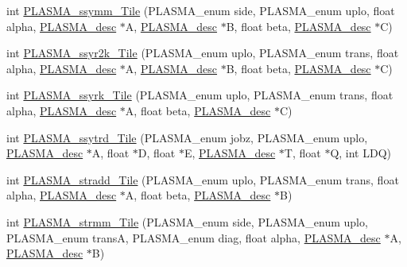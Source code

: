 \begin{DoxyCompactItemize}
\item 
int \hyperlink{group__float__Tile_gaed8391eebdf7b458e7a62dbfb6caff93_gaed8391eebdf7b458e7a62dbfb6caff93}{P\+L\+A\+S\+M\+A\+\_\+ssymm\+\_\+\+Tile} (P\+L\+A\+S\+M\+A\+\_\+enum side, P\+L\+A\+S\+M\+A\+\_\+enum uplo, float alpha, \hyperlink{structplasma__desc__t}{P\+L\+A\+S\+M\+A\+\_\+desc} $\ast$A, \hyperlink{structplasma__desc__t}{P\+L\+A\+S\+M\+A\+\_\+desc} $\ast$B, float beta, \hyperlink{structplasma__desc__t}{P\+L\+A\+S\+M\+A\+\_\+desc} $\ast$C)
\item 
int \hyperlink{group__float__Tile_ga1c0cbf7def70b0d7783d944051aef00e_ga1c0cbf7def70b0d7783d944051aef00e}{P\+L\+A\+S\+M\+A\+\_\+ssyr2k\+\_\+\+Tile} (P\+L\+A\+S\+M\+A\+\_\+enum uplo, P\+L\+A\+S\+M\+A\+\_\+enum trans, float alpha, \hyperlink{structplasma__desc__t}{P\+L\+A\+S\+M\+A\+\_\+desc} $\ast$A, \hyperlink{structplasma__desc__t}{P\+L\+A\+S\+M\+A\+\_\+desc} $\ast$B, float beta, \hyperlink{structplasma__desc__t}{P\+L\+A\+S\+M\+A\+\_\+desc} $\ast$C)
\item 
int \hyperlink{group__float__Tile_gacf870fa2eddaa1a0c47b0ac8ddecab46_gacf870fa2eddaa1a0c47b0ac8ddecab46}{P\+L\+A\+S\+M\+A\+\_\+ssyrk\+\_\+\+Tile} (P\+L\+A\+S\+M\+A\+\_\+enum uplo, P\+L\+A\+S\+M\+A\+\_\+enum trans, float alpha, \hyperlink{structplasma__desc__t}{P\+L\+A\+S\+M\+A\+\_\+desc} $\ast$A, float beta, \hyperlink{structplasma__desc__t}{P\+L\+A\+S\+M\+A\+\_\+desc} $\ast$C)
\item 
int \hyperlink{group__float__Tile_ga48bcda071b83ef090b76b5e19aedc803_ga48bcda071b83ef090b76b5e19aedc803}{P\+L\+A\+S\+M\+A\+\_\+ssytrd\+\_\+\+Tile} (P\+L\+A\+S\+M\+A\+\_\+enum jobz, P\+L\+A\+S\+M\+A\+\_\+enum uplo, \hyperlink{structplasma__desc__t}{P\+L\+A\+S\+M\+A\+\_\+desc} $\ast$A, float $\ast$D, float $\ast$E, \hyperlink{structplasma__desc__t}{P\+L\+A\+S\+M\+A\+\_\+desc} $\ast$T, float $\ast$Q, int L\+D\+Q)
\item 
int \hyperlink{group__float__Tile_gaf9bfae96f9bb34fa3008c593a5b5e948_gaf9bfae96f9bb34fa3008c593a5b5e948}{P\+L\+A\+S\+M\+A\+\_\+stradd\+\_\+\+Tile} (P\+L\+A\+S\+M\+A\+\_\+enum uplo, P\+L\+A\+S\+M\+A\+\_\+enum trans, float alpha, \hyperlink{structplasma__desc__t}{P\+L\+A\+S\+M\+A\+\_\+desc} $\ast$A, float beta, \hyperlink{structplasma__desc__t}{P\+L\+A\+S\+M\+A\+\_\+desc} $\ast$B)
\item 
int \hyperlink{group__float__Tile_gaa0df9bf7d0c90ae68302342d80000324_gaa0df9bf7d0c90ae68302342d80000324}{P\+L\+A\+S\+M\+A\+\_\+strmm\+\_\+\+Tile} (P\+L\+A\+S\+M\+A\+\_\+enum side, P\+L\+A\+S\+M\+A\+\_\+enum uplo, P\+L\+A\+S\+M\+A\+\_\+enum trans\+A, P\+L\+A\+S\+M\+A\+\_\+enum diag, float alpha, \hyperlink{structplasma__desc__t}{P\+L\+A\+S\+M\+A\+\_\+desc} $\ast$A, \hyperlink{structplasma__desc__t}{P\+L\+A\+S\+M\+A\+\_\+desc} $\ast$B)

\end{DoxyCompactItemize}

